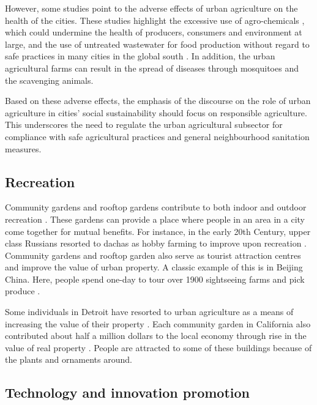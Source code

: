 However, some studies point to the adverse effects of urban agriculture on the health of the cities. These studies highlight the excessive use of agro-chemicals \cite{Veenhuizen, Amoah2007, Agbenyour2014}, which could undermine the health of producers, consumers and environment at large, and the use of untreated wastewater for food production without regard to safe practices in many cities in the global south \cite{Amponsah2015, Veenhuizen, Becerra-Castro2015, Amponsah2015, Mara2010, Ndunda}. In addition, the urban agricultural farms can result in the spread of diseases through mosquitoes and the scavenging animals.

Based on these adverse effects, the emphasis of the discourse on the role of urban agriculture in cities' social sustainability should focus on responsible agriculture. This underscores the need to regulate the urban agricultural subsector for compliance with safe agricultural practices and general neighbourhood sanitation measures.

\subsection{Recreation}

Community gardens and rooftop gardens contribute to both indoor and outdoor recreation \cite{Hamilton2014}. These gardens can provide a place where people in an area in a city come together for mutual benefits. For instance, in the early 20th Century, upper class Russians resorted to dachas as hobby farming to improve upon recreation \cite{Hamilton2014}. Community gardens and rooftop garden also serve as tourist attraction centres \cite{InternationalLabourOrganization2006} and improve the value of urban property. A classic example of this is in Beijing China. Here, people spend one-day to tour over 1900 sightseeing farms and pick produce \cite{InternationalLabourOrganization2006}.

Some individuals in Detroit have resorted to urban agriculture as a means of increasing the value of their property \cite{Walker2016}. Each community garden in California also contributed about half a million dollars to the local economy through rise in the value of real property \cite{Voicu2008}. People are attracted to some of these buildings because of the plants and ornaments around.

\subsection{Technology and innovation promotion}

